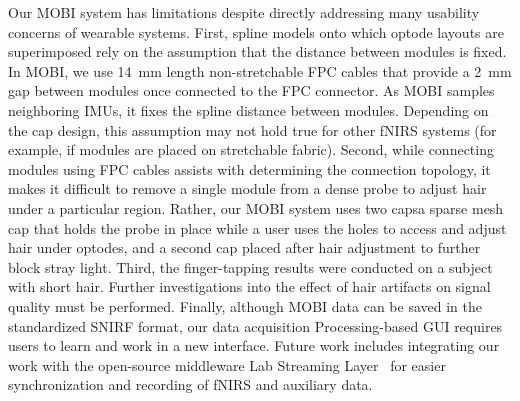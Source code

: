 Our \ac{MOBI} system has limitations despite directly addressing many usability concerns of wearable systems. First, spline models onto which optode layouts are superimposed rely on the assumption that the distance between modules is fixed. In \ac{MOBI}, we use 14~mm length non-stretchable FPC cables that provide a 2~mm gap between modules once connected to the FPC connector. As \ac{MOBI} samples neighboring IMUs, it fixes the spline distance between modules. Depending on the cap design, this assumption may not hold true for other \ac{fNIRS} systems (for example, if modules are placed on stretchable fabric). Second, while connecting modules using FPC cables assists with determining the connection topology, it makes it difficult to remove a single module from a dense probe to adjust hair under a particular region. Rather, our \ac{MOBI} system uses two caps\textemdash a sparse mesh cap that holds the probe in place while a user uses the holes to access and adjust hair under optodes, and a second cap placed after hair adjustment to further block stray light. Third, the finger-tapping results were conducted on a subject with short hair. Further investigations into the effect of hair artifacts on signal quality must be performed. Finally, although \ac{MOBI} data can be saved in the standardized SNIRF format, our data acquisition Processing-based GUI requires users to learn and work in a new interface. Future work includes integrating our work with the open-source middleware Lab Streaming Layer~\cite{LSL2014} for easier synchronization and recording of \ac{fNIRS} and auxiliary data. 


